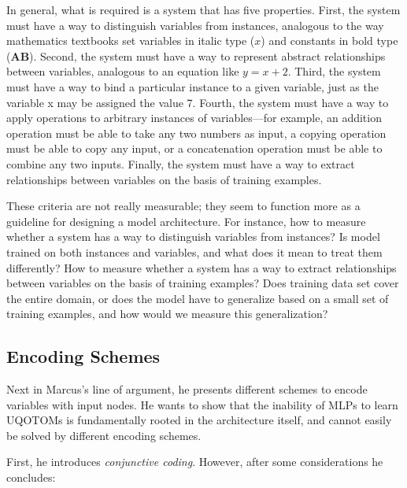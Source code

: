 \documentclass[../../main.tex]{subfiles}
\begin{document}
\begin{citecallout}
    In general, what is required is a system that has five properties. First,
    the system must have a way to distinguish variables from instances,
    analogous to the way mathematics textbooks set variables in italic type
    ($x$) and constants in bold type ($\bm{AB}$). Second, the system must have a way
    to represent abstract relationships between variables, analogous to an
    equation like $y = x + 2$. Third, the system must have a way to bind a
    particular instance to a given variable, just as the variable x may be
    assigned the value 7. Fourth, the system must have a way to apply operations to arbitrary instances of variables—for example, an addition
    operation must be able to take any two numbers as input, a copying
    operation must be able to copy any input, or a concatenation operation
    must be able to combine any two inputs. Finally, the system must have a
    way to extract relationships between variables on the basis of training
    examples.
\end{citecallout}

\begin{critique}
    These criteria are not really measurable; they seem to function more as a guideline for designing a model architecture. For instance, how to measure whether a system has a way to distinguish variables from instances? Is model trained on both instances and variables, and what does it mean to treat them differently? How to measure whether a system has a way to extract relationships between variables on the basis of training examples? Does training data set cover the entire domain, or does the model have to generalize based on a small set of training examples, and how would we measure this generalization?
\end{critique}

\subsection{Encoding Schemes}
Next in Marcus's line of argument, he presents different schemes to encode variables with input nodes. He wants to show that the inability of MLPs to learn UQOTOMs is fundamentally rooted in the architecture itself, and cannot easily be solved by different encoding schemes.

First, he introduces \emph{conjunctive coding}. However, after some considerations he concludes:
\end{document}
